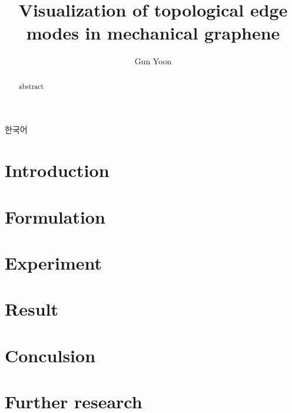 \documentclass[a4paper]{article}
\title{Visualization of topological edge modes in mechanical graphene}
\author{Gun Yoon}
\begin{document}
\maketitle

\begin{abstract}
    abstract 
\end{abstract}

\newpage

\begin{multicols*}{2}
    
    한국어

    \section{Introduction}

    

    \section{Formulation}

    

    \section{Experiment}

    

    \section{Result}

    \section{Conculsion}

    \section{Further research}

    
    

\end{multicols*}
\end{document}
